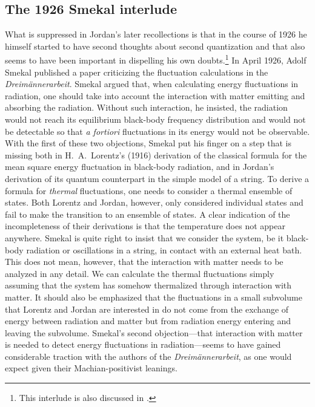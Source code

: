 \documentclass[12pt]{elsart}
\begin{document}
\subsection{The 1926 Smekal interlude}

What is suppressed in Jordan's later recollections is that in the course of 1926 he himself started to have second thoughts about second quantization and that \citep{Dirac 1927} also seems to have been important in dispelling his own doubts.\footnote{This interlude is also discussed in \citep[pp.\ 222--225]{Darrigol 1986}.}  In April 1926, Adolf Smekal published a paper criticizing the fluctuation calculations in the {\it Dreim\"annerarbeit}. Smekal argued that, when calculating energy fluctuations in radiation, one should take into account the interaction with matter emitting and absorbing the radiation. Without such interaction, he insisted, the radiation would not reach its equilibrium black-body frequency distribution and would not be detectable so that {\it a fortiori} fluctuations in its energy would not be observable. With the first of these two objections, Smekal put his finger on a step that is missing both in H.\ A.\ Lorentz's (1916) derivation of the classical formula for the mean square energy fluctuation in black-body radiation, and in Jordan's derivation of its quantum counterpart in the simple model of a string. To derive a formula for {\it thermal} fluctuations, one needs to consider a thermal ensemble of states. Both Lorentz and Jordan, however, only considered individual states and fail to make the transition to an ensemble of states. A clear indication of the incompleteness of their derivations is that the temperature does not appear anywhere. Smekal is quite right to insist that we consider the system, be it black-body radiation or oscillations in a string, in contact with an external heat bath. This does not mean, however, that the interaction with matter needs to be analyzed in any detail.  We can calculate the thermal fluctuations simply assuming that the system has somehow thermalized through interaction with matter. It should also be emphasized that the fluctuations in a small subvolume that Lorentz and Jordan are interested in do not come from the exchange of energy between radiation and matter but from radiation energy entering and leaving the subvolume. Smekal's second objection---that interaction with matter is needed to detect energy fluctuations in radiation---seems to have gained considerable traction with the authors of the {\it Dreim\"annerarbeit}, as one would expect given their Machian-positivist leanings.
\end{document}
